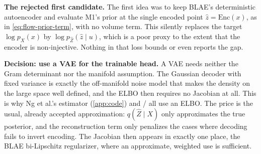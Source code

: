 \textbf{The rejected first candidate.} 
The first idea was to keep BLAE's deterministic autoencoder
and evaluate M1's prior at the single encoded point $\hat z=\mathrm{Enc}(x)$, as in
\cref{eq:flow-prior-term}, with no volume term. This silently replaces the target $\log p_X(x)$ by
$\log p_{\hat Z}(\hat z\mid u)$, which is a poor proxy to the extent that the encoder is non-injective.
Nothing in that loss bounds or even reports the gap.

\textbf{Decision: use a VAE for the trainable head.} A VAE needs neither the Gram determinant nor the
manifold assumption. The Gaussian decoder with fixed variance is exactly the off-manifold noise model
that makes the density on the large space well defined, and the ELBO then requires no Jacobian at all.
This is why Ng et al.'s estimator (\cref{app:code}) and / all use
an ELBO. The price is the usual, already accepted approximation: $q(\hat Z\mid X)$ only approximates the
true posterior, and the reconstruction term only penalizes the cases where decoding fails to invert
encoding. The Jacobian then appears in exactly one place, the BLAE bi-Lipschitz regularizer, where an
approximate, weighted use is sufficient.

